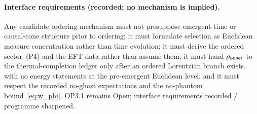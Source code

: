 \paragraph{Interface requirements (recorded; no mechanism is
implied).}
Any candidate ordering mechanism must not presuppose emergent-time
or causal-cone structure prior to ordering; it must formulate
selection as Euclidean measure concentration rather than time
evolution; it must derive the ordered sector~(P4) and the EFT data
rather than assume them; it must hand $\rho_{\rm onset}$ to the
thermal-completion ledger only after an ordered Lorentzian branch
exists, with no energy statements at the pre-emergent Euclidean
level; and it must respect the recorded no-ghost expectations and
the no-phantom bound~\eqref{eq:w_phi}.
OP3.1 remains Open; interface requirements recorded / programme
sharpened.


